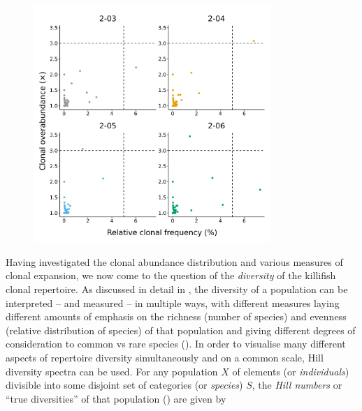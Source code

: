 \begin{figure}
\centering
\includegraphics[width=0.8\textwidth]{_Figures/png/pilot-clones-expansions}
\label{fig:igseq-pilot-clones-expansions}
\end{figure}

Having investigated the clonal abundance distribution and various measures of clonal expansion, we now come to the question of the \textit{diversity} of the killifish clonal repertoire. As discussed in detail in , the diversity of a population can be interpreted -- and measured -- in multiple ways, with different measures laying different amounts of emphasis on the richness (number of species) and evenness (relative distribution of species) of that population and giving different degrees of consideration to common vs rare species (). In order to visualise many different aspects of repertoire diversity simultaneously and on a common scale, Hill diversity spectra \parencite{hill1973diversity} can be used. For any population $X$ of elements (or \textit{individuals}) divisible into some disjoint set of categories (or \textit{species}) $S$, the \textit{Hill numbers} or ``true diversities'' of that population () \parencite{hill1973diversity, jost2006entropy} are given by

